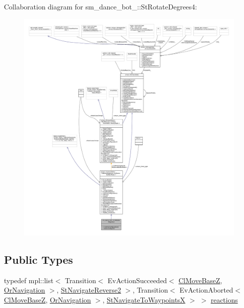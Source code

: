 Collaboration diagram for sm\+\_\+dance\+\_\+bot\+\_\+:\+:St\+Rotate\+Degrees4\+:
\nopagebreak
\begin{figure}[H]
\begin{center}
\leavevmode
\includegraphics[width=350pt]{structsm__dance__bot__3_1_1StRotateDegrees4__coll__graph}
\end{center}
\end{figure}
\subsection*{Public Types}
\begin{DoxyCompactItemize}
\item 
typedef mpl\+::list$<$ Transition$<$ Ev\+Action\+Succeeded$<$ \hyperlink{classmove__base__z__client_1_1ClMoveBaseZ}{Cl\+Move\+BaseZ}, \hyperlink{classsm__dance__bot__3_1_1OrNavigation}{Or\+Navigation} $>$, \hyperlink{structsm__dance__bot__3_1_1StNavigateReverse2}{St\+Navigate\+Reverse2} $>$, Transition$<$ Ev\+Action\+Aborted$<$ \hyperlink{classmove__base__z__client_1_1ClMoveBaseZ}{Cl\+Move\+BaseZ}, \hyperlink{classsm__dance__bot__3_1_1OrNavigation}{Or\+Navigation} $>$, \hyperlink{structsm__dance__bot__3_1_1StNavigateToWaypointsX}{St\+Navigate\+To\+WaypointsX} $>$ $>$ \hyperlink{structsm__dance__bot__3_1_1StRotateDegrees4_afe142f688a5c9c61206a3c47024e0a35}{reactions}
\end{DoxyCompactItemize}
